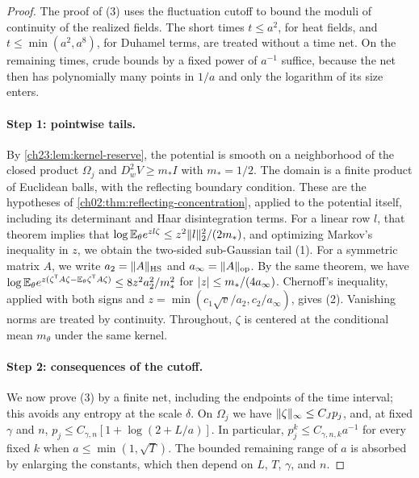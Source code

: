 \begin{proof}
The proof of (3) uses the fluctuation cutoff to bound the moduli of continuity of the realized fields. The short times $t\le a^2$, for heat fields, and $t\le\min(a^2,a^8)$, for Duhamel terms, are treated without a time net. On the remaining times, crude bounds by a fixed power of $a^{-1}$ suffice, because the net then has polynomially many points in $1/a$ and only the logarithm of its size enters.

\paragraph{Step 1: pointwise tails.}
By \cref{ch23:lem:kernel-reserve}, the potential is smooth on a neighborhood of the closed product $\Omega_j$ and $D_w^2V\ge m_*I$ with $m_*=1/2$. The domain is a finite product of Euclidean balls, with the reflecting boundary condition. These are the hypotheses of \cref{ch02:thm:reflecting-concentration}, applied to the potential itself, including its determinant and Haar disintegration terms. For a linear row $l$, that theorem implies that $\log\mathbb E_\theta e^{zl\zeta}\le z^2\lVert l\rVert_2^2/(2m_*)$, and optimizing Markov's inequality in $z$, we obtain the two-sided sub-Gaussian tail (1). For a symmetric matrix $A$, we write $a_2=\lVert A\rVert_{\mathrm{HS}}$ and $a_\infty=\lVert A\rVert_{\mathrm{op}}$. By the same theorem, we have $\log\mathbb E_\theta e^{z(\zeta^{\mathsf T}A\zeta-\mathbb E_\theta\zeta^{\mathsf T}A\zeta)}\le8z^2a_2^2/m_*^2$ for $\lvert z\rvert\le m_*/(4a_\infty)$. Chernoff's inequality, applied with both signs and $z=\min(c_1\sqrt v/a_2,c_2/a_\infty)$, gives (2). Vanishing norms are treated by continuity. Throughout, $\zeta$ is centered at the conditional mean $m_\theta$ under the same kernel.

\paragraph{Step 2: consequences of the cutoff.}
We now prove (3) by a finite net, including the endpoints of the time interval; this avoids any entropy at the scale $\delta$. On $\Omega_j$ we have $\lVert \zeta\rVert_\infty\le C_Jp_j$, and, at fixed $\gamma$ and $n$, $p_j\le C_{\gamma,n}[1+\log(2+L/a)]$. In particular, $p_j^k\le C_{\gamma,n,k}a^{-1}$ for every fixed $k$ when $a\le\min(1,\sqrt T)$. The bounded remaining range of $a$ is absorbed by enlarging the constants, which then depend on $L$, $T$, $\gamma$, and $n$.


\end{proof}
